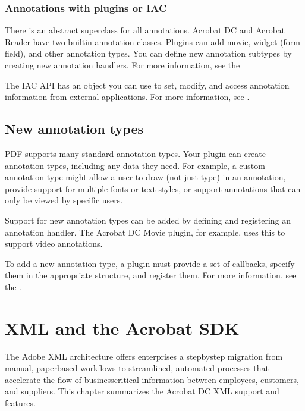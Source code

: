 \documentclass[letterpaper,12pt,english,openany,oneside]{sphinxmanual}
\begin{document}
\subsection{Annotations with plug\sphinxhyphen{}ins or IAC}
\label{\detokenize{Overview_CustomWorkflows:annotations-with-plug-ins-or-iac}}
There is an abstract superclass for all annotations. Acrobat DC and Acrobat Reader have two built\sphinxhyphen{}in annotation classes. Plug\sphinxhyphen{}ins can add movie, widget (form field), and other annotation types. You can define new annotation subtypes by creating new annotation handlers. For more information, see the  

The IAC API has an object you can use to set, modify, and access annotation information from external applications. For more information, see  .




\section{New annotation types}
\label{\detokenize{Overview_CustomWorkflows:new-annotation-types}}
PDF supports many standard annotation types. Your plug\sphinxhyphen{}in can create annotation types, including any data they need. For example, a custom annotation type might allow a user to draw (not just type) in an annotation, provide support for multiple fonts or text styles, or support annotations that can only be viewed by specific users.

Support for new annotation types can be added by defining and registering an annotation handler. The Acrobat DC Movie plug\sphinxhyphen{}in, for example, uses this to support video annotations.

To add a new annotation type, a plug\sphinxhyphen{}in must provide a set of callbacks, specify them in the appropriate structure, and register them. For more information, see the  .


\chapter{XML and the Acrobat SDK}
\label{\detokenize{Overview_XML:xml-and-the-acrobat-sdk}}\label{\detokenize{Overview_XML::doc}}
The Adobe XML architecture offers enterprises a step\sphinxhyphen{}by\sphinxhyphen{}step migration from manual, paper\sphinxhyphen{}based workflows to streamlined, automated processes that accelerate the flow of business\sphinxhyphen{}critical information between employees, customers, and suppliers. This chapter summarizes the Acrobat DC XML support and features.
\end{document}
